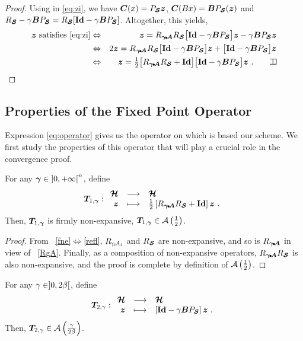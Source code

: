\ifx\siam\undefined \begin{proof}  \fi
%
Using  in \eqref{eq:zi}, we have $\boldsymbol C(x) = P_{\boldsymbol {\mathcal{S}}} \boldsymbol z$, $\boldsymbol C(B x) = \boldsymbol BP_{\boldsymbol {\mathcal{S}}}(\boldsymbol z)$ and $R_{\boldsymbol {\mathcal{S}}} - \gamma \boldsymbol BP_{\boldsymbol {\mathcal{S}}} = R_{\boldsymbol {\mathcal{S}}}  [\mathbf{Id} - \gamma \boldsymbol BP_{\boldsymbol {\mathcal{S}}}]$. Altogether, this yields,
%
\begin{eqnarray*}
 \bz \sobjs{satisfies} \eqref{eq:zi} & \Leftrightarrow & \hphantom{2}\bz = \RgA \RS \big[ \bId - \ga \bBJ \big] \bz - \ga \bBJ \bz  \\
  & \Leftrightarrow & 2 \bz = \RgA \RS \big[ \bId - \ga \bBJ \big] \bz + \big[ \bId - \ga \bBJ \big] \bz  \\
  & \Leftrightarrow & \hphantom{2}\bz = \half \big[ \RgA \RS + \bId \big] \big[ \bId - \ga \bBJ \big] \bz~.
\ifx\siam\undefined \else \qquad\endproof \fi
\end{eqnarray*}
\ifx\siam\undefined \end{proof} \fi

\subsection{Properties of the Fixed Point Operator}
\label{sec:fix-pointop}
Expression \eqref{eq:operator} gives us the operator on which is based our \GFB scheme. We first study the properties of this operator that will play a crucial role in the convergence proof.

\begin{proposition}
For any $\boldsymbol{\gamma} \in {]0,{+}\infty[}^n$, define
%
\begin{equation}\label{eq:Tb}
\Tb : \begin{array}{rcl} \bHh & \longrightarrow & \bHh \\
	\bz & \longmapsto & \half \left[ \RgA  \RS + \bId \right] \bz~.
\end{array}
\end{equation}
% 
Then, $\boldsymbol T_{1,\boldsymbol{\gamma}}$ is firmly non-expansive, \ie $\boldsymbol T_{1,\boldsymbol{\gamma}} \in \mathcal{A}\left(  {\textstyle \frac{1}{2}}  \right)$.
\label{prop:Tb}
\end{proposition}

\begin{proof}
From ~\ref{fne}$\Leftrightarrow$\ref{refl}, $R_{\!\gamma_i\!A_i}$ and $R_{\boldsymbol {\mathcal{S}}}$ are non-expansive, and so is $R_{\boldsymbol{\gamma} {\scriptscriptstyle \! \bullet \!} \boldsymbol A}$ in view of ~\ref{RgA}. Finally, as a composition of non-expansive operators, $R_{\boldsymbol{\gamma} {\scriptscriptstyle \! \bullet \!} \boldsymbol A}R_{\boldsymbol {\mathcal{S}}}$ is also non-expansive, and the proof is complete by definition of $\mathcal{A}\left(  {\textstyle \frac{1}{2}}  \right)$.
\end{proof}

\begin{proposition}
For any $\gamma \in ]0,2\beta[$, define
%
\begin{equation}\label{eq:Tf}
\Tf : \begin{array}{rcl} \bHh & \longrightarrow & \bHh \\
	\bz & \longmapsto & \left[ \bId - \ga \bBJ \right] \bz ~.\end{array}
\end{equation}
%
Then, $\boldsymbol T_{2,\gamma} \in \mathcal{A} \left(  \frac{\gamma}{2 \beta}  \right)$.
\label{prop:Tf}
\end{proposition}

